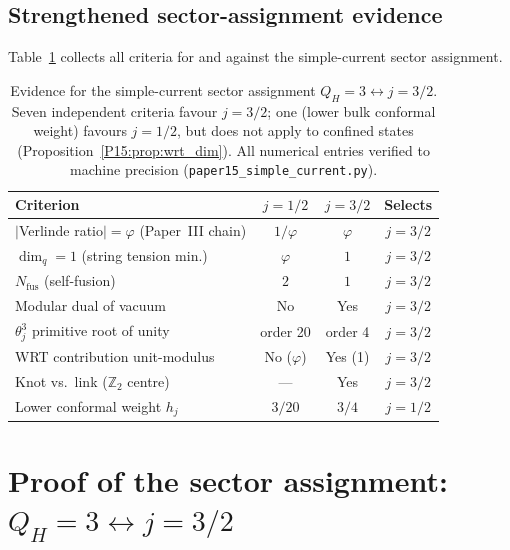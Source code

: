 \documentclass[11pt,a4paper]{article}
\theoremstyle{definition}\newtheorem{definition}[theorem]{Definition}
\theoremstyle{remark}
\newcommand{\vp}{\varphi}
\newcommand{\QH}{Q_H}
\begin{document}
\subsection{Strengthened sector-assignment evidence}
\label{P15:sec:wrt_summary}

Table~\ref{P15:tab:sector_evidence} collects all criteria for and against
the simple-current sector assignment.

\begin{table}[h!]
\centering
\renewcommand{\arraystretch}{1.35}
\begin{tabular}{lccc}
\toprule
Criterion & $j=1/2$ & $j=3/2$ & Selects \\
\midrule
$|$Verlinde ratio$|=\vp$ (Paper~III chain) & $1/\vp$ & $\vp$ & $j=3/2$ \\
$\dim_q = 1$ (string tension min.)         & $\vp$   & $1$   & $j=3/2$ \\
$N_{\mathrm{fus}}$ (self-fusion)            & $2$     & $1$   & $j=3/2$ \\
Modular dual of vacuum                      & No      & Yes   & $j=3/2$ \\
$\theta_j^3$ primitive root of unity        & order 20 & order 4 & $j=3/2$ \\
WRT contribution unit-modulus               & No ($\vp$) & Yes (1) & $j=3/2$ \\
Knot vs.\ link ($\mathbb{Z}_2$ centre)     & —       & Yes   & $j=3/2$ \\
Lower conformal weight $h_j$                & $3/20$  & $3/4$ & $j=1/2$ \\
\bottomrule
\end{tabular}
\caption{Evidence for the simple-current sector assignment
$\QH=3\leftrightarrow j=3/2$.
Seven independent criteria favour $j=3/2$; one (lower bulk conformal weight)
favours $j=1/2$, but does not apply to confined states
(Proposition~\ref{P15:prop:wrt_dim}).
All numerical entries verified to machine precision
(\texttt{paper15\_simple\_current.py}).}
\label{P15:tab:sector_evidence}
\end{table}

\section{Proof of the sector assignment: $\QH=3\leftrightarrow j=3/2$}
\label{P15:sec:sector_proof}
\end{document}
